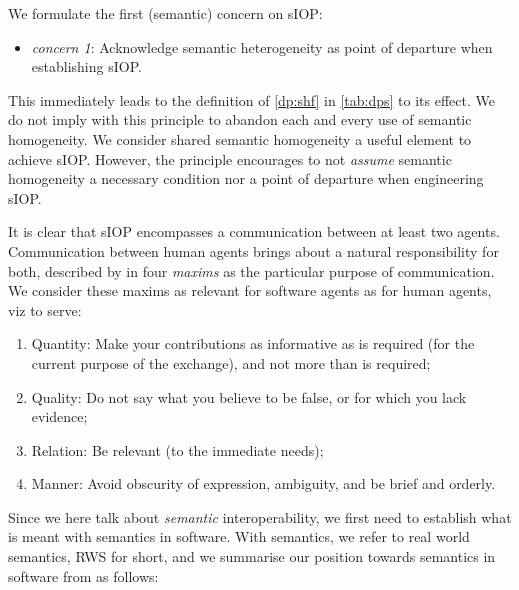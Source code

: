 \documentclass[sort&compress,preprint,authoryear,3p,twocolumn]{elsarticle}
\providecommand{\tightlist}{%
  \setlength{\itemsep}{0pt}\setlength{\parskip}{0pt}}
\begin{document}
We formulate the first (semantic) concern on sIOP:

\begin{itemize}
\tightlist
\item
  \emph{concern 1}: Acknowledge semantic heterogeneity as point of
  departure when establishing sIOP.
\end{itemize}

This immediately leads to the definition of \cref{dp:shf} in
\cref{tab:dps} to its effect. We do not imply with this principle to
abandon each and every use of semantic homogeneity. We consider shared
semantic homogeneity a useful element to achieve sIOP. However, the
principle encourages to not \emph{assume} semantic homogeneity a
necessary condition nor a point of departure when engineering sIOP.

It is clear that sIOP encompasses a communication between at least two
agents. Communication between human agents brings about a natural
responsibility for both, described by \citep{Grice:1991BT} in four
\emph{maxims} as the particular purpose of communication. We consider
these maxims as relevant for software agents as for human agents, viz to
serve:

\begin{enumerate}
\def\labelenumi{\arabic{enumi}.}
\tightlist
\item
  Quantity: Make your contributions as informative as is required (for
  the current purpose of the exchange), and not more than is required;
\item
  Quality: Do not say what you believe to be false, or for which you
  lack evidence;
\item
  Relation: Be relevant (to the immediate needs);
\item
  Manner: Avoid obscurity of expression, ambiguity, and be brief and
  orderly.
\end{enumerate}

Since we here talk about \emph{semantic} interoperability, we first need
to establish what is meant with semantics in software. With semantics,
we refer to real world semantics, RWS for short, and we summarise our
position towards semantics in software from \citep{Brandt2021a} as
follows:
\end{document}
